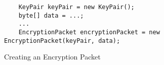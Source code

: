 \begin{figure}[H]
  \centering
  \begin{verbatim}
	KeyPair keyPair = new KeyPair();
	byte[] data = ...;
	...
	EncryptionPacket encryptionPacket = new EncryptionPacket(keyPair, data);
  \end{verbatim}
  \caption{Creating an Encryption Packet}
  \label{code:encryption_packet_instantiation}
\end{figure}
